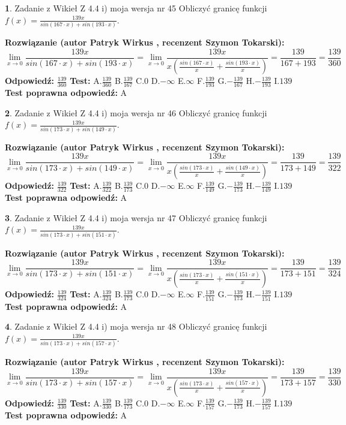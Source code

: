 \documentclass[12pt, a4paper]{article}
\theoremstyle{definition} %
\newtheorem{zad}{}
\newcommand{\zadStart}[1]{\begin{zad}#1\newline}
\newcommand{\zadStop}{\end{zad}}
\newcommand{\rozwStart}[2]{\noindent \textbf{Rozwiązanie (autor #1 , recenzent #2): }\newline}
\newcommand{\rozwStop}{\newline}
\newcommand{\odpStart}{\noindent \textbf{Odpowiedź:}\newline}
\newcommand{\odpStop}{\newline}
\newcommand{\testStart}{\noindent \textbf{Test:}\newline}
\newcommand{\testStop}{\newline}
\newcommand{\kluczStart}{\noindent \textbf{Test poprawna odpowiedź:}\newline}
\newcommand{\kluczStop}{\newline}
\begin{document}
\zadStart{Zadanie z Wikieł Z 4.4 i) moja wersja nr 45}
Obliczyć granicę funkcji $f(x)=\frac{139x}{sin(167\cdot x) +sin(193\cdot x)}$.
\zadStop
\rozwStart{Patryk Wirkus}{Szymon Tokarski}
$$\lim\limits_{x\to 0}\frac{139x}{sin(167\cdot x) +sin(193\cdot x)}=\lim\limits_{x\to 0}\frac{139x}{x(\frac{sin(167\cdot x)}{x}+\frac{sin(193\cdot x)}{x})}=\frac{139}{167+193} = \frac{139}{360}$$
\rozwStop
\odpStart
$\frac{139}{360}$
\odpStop
\testStart
A.$\frac{139}{360}$
B.$\frac{139}{167}$
C.$0$
D.$-\infty$
E.$\infty$
F.$\frac{139}{193}$
G.$-\frac{139}{167}$
H.$-\frac{139}{193}$
I.$139$
\testStop
\kluczStart
A
\kluczStop



\zadStart{Zadanie z Wikieł Z 4.4 i) moja wersja nr 46}
Obliczyć granicę funkcji $f(x)=\frac{139x}{sin(173\cdot x) +sin(149\cdot x)}$.
\zadStop
\rozwStart{Patryk Wirkus}{Szymon Tokarski}
$$\lim\limits_{x\to 0}\frac{139x}{sin(173\cdot x) +sin(149\cdot x)}=\lim\limits_{x\to 0}\frac{139x}{x(\frac{sin(173\cdot x)}{x}+\frac{sin(149\cdot x)}{x})}=\frac{139}{173+149} = \frac{139}{322}$$
\rozwStop
\odpStart
$\frac{139}{322}$
\odpStop
\testStart
A.$\frac{139}{322}$
B.$\frac{139}{173}$
C.$0$
D.$-\infty$
E.$\infty$
F.$\frac{139}{149}$
G.$-\frac{139}{173}$
H.$-\frac{139}{149}$
I.$139$
\testStop
\kluczStart
A
\kluczStop



\zadStart{Zadanie z Wikieł Z 4.4 i) moja wersja nr 47}
Obliczyć granicę funkcji $f(x)=\frac{139x}{sin(173\cdot x) +sin(151\cdot x)}$.
\zadStop
\rozwStart{Patryk Wirkus}{Szymon Tokarski}
$$\lim\limits_{x\to 0}\frac{139x}{sin(173\cdot x) +sin(151\cdot x)}=\lim\limits_{x\to 0}\frac{139x}{x(\frac{sin(173\cdot x)}{x}+\frac{sin(151\cdot x)}{x})}=\frac{139}{173+151} = \frac{139}{324}$$
\rozwStop
\odpStart
$\frac{139}{324}$
\odpStop
\testStart
A.$\frac{139}{324}$
B.$\frac{139}{173}$
C.$0$
D.$-\infty$
E.$\infty$
F.$\frac{139}{151}$
G.$-\frac{139}{173}$
H.$-\frac{139}{151}$
I.$139$
\testStop
\kluczStart
A
\kluczStop



\zadStart{Zadanie z Wikieł Z 4.4 i) moja wersja nr 48}
Obliczyć granicę funkcji $f(x)=\frac{139x}{sin(173\cdot x) +sin(157\cdot x)}$.
\zadStop
\rozwStart{Patryk Wirkus}{Szymon Tokarski}
$$\lim\limits_{x\to 0}\frac{139x}{sin(173\cdot x) +sin(157\cdot x)}=\lim\limits_{x\to 0}\frac{139x}{x(\frac{sin(173\cdot x)}{x}+\frac{sin(157\cdot x)}{x})}=\frac{139}{173+157} = \frac{139}{330}$$
\rozwStop
\odpStart
$\frac{139}{330}$
\odpStop
\testStart
A.$\frac{139}{330}$
B.$\frac{139}{173}$
C.$0$
D.$-\infty$
E.$\infty$
F.$\frac{139}{157}$
G.$-\frac{139}{173}$
H.$-\frac{139}{157}$
I.$139$
\testStop
\kluczStart
A
\kluczStop
\end{document}
